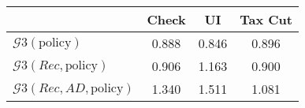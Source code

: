 \begin{tabular}{@{}lccc@{}}
\toprule
                          & Check      & UI    & Tax Cut    \\  \midrule
$\mathcal{G}3(\text{policy})$ & 0.888  & 0.846  & 0.896     \\
$\mathcal{G}3(Rec,\text{policy})$ & 0.906  & 1.163  & 0.900     \\
$\mathcal{G}3(Rec, AD,\text{policy})$ & 1.340  & 1.511  & 1.081     \\
\end{tabular}
